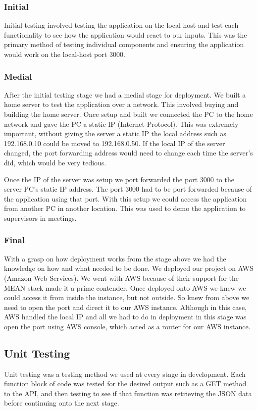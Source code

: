 \subsubsection{Initial}
Initial testing involved testing the application on the local-host and test each functionality to see how the application would react to our inputs. This was the primary method of testing individual components and ensuring the application would work on the local-host port 3000.

\subsubsection{Medial}
After the initial testing stage we had a medial stage for deployment. We built a home server to test the application over a network. This involved buying and building the home server. Once setup and built we connected the PC to the home network and gave the PC a static IP (Internet Protocol). This was extremely important, without giving the server a static IP the local address such as 192.168.0.10 could be moved to 192.168.0.50. If the local IP of the server changed, the port forwarding address would need to change each time the server's did, which would be very tedious. 

Once the IP of the server was setup we port forwarded the port 3000 to the server PC's static IP address. The port 3000 had to be port forwarded because of the application using that port. With this setup we could access the application from another PC in another location. This was used to demo the application to supervisors in meetings.

\subsubsection{Final}
With a grasp on how deployment works from the stage above we had the knowledge on how and what needed to be done. We deployed our project on AWS (Amazon Web Services). We went with AWS because of their support for the MEAN stack made it a prime contender. Once deployed onto AWS we knew we could access it from inside the instance, but not outside. So knew from above we need to open the port and direct it to our AWS instance. Although in this case, AWS handled the local IP and all we had to do in deployment in this stage was open the port using AWS console, which acted as a router for our AWS instance.

\subsection{Unit Testing}
Unit testing was a testing method we used at every stage in development. Each function block of code was tested for the desired output such as a GET method to the API, and then testing to see if that function was retrieving the JSON data before continuing onto the next stage.

